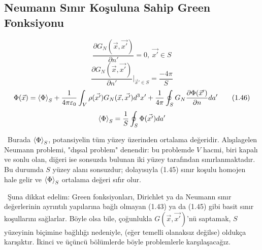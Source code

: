 \subsection{Neumann Sınır Koşuluna Sahip Green Fonksiyonu}
\begin{theorem}
\[ \dfrac{\partial G_{N}(\Vec{x}, \Vec{x'}) }{\partial n'} = 0, \ \Vec{x'} \in S \]
\[  \dfrac{\partial G_{N}(\Vec{x}, \Vec{x'}) }{\partial n'} \Bigg|_{\Vec{x}' \in S}= \dfrac{- 4 \pi}{S} \tag{1.45} \]
\[ \Phi (\Vec{x}) = \left<  \Phi \right>_{S} + \dfrac{1}{4 \pi \varepsilon_{0}} \int_{V} \rho (\Vec{x'}) G_{N} (\Vec{x}, \Vec{x'}) d^{3}x' + \dfrac{1}{4 \pi} \oint_{S} G_{N} \dfrac{\partial \Phi (\Vec{x}')}{\partial n} da' \tag{1.46}  \]
\[  \left<  \Phi \right>_{S} = \dfrac{1}{S} \oint_{S} \Phi (\Vec{x'}) da'\]
\end{theorem}

\dangersign \ Burada $\left<  \Phi \right>_{S}$, potansiyelin tüm yüzey üzerinden ortalama değeridir. Alışılagelen Neumann problemi, "dışsal problem" denendir: bu problemde $V$ hacmi, biri kapalı ve sonlu olan, diğeri ise sonsuzda bulunan iki yüzey tarafından sınırlanmaktadır. Bu durumda $S$ yüzey alanı sonsuzdur; dolayısıyla (1.45) sınır koşulu homojen hale gelir ve $\left<  \Phi \right>_{S}$ ortalama değeri sıfır olur.

\
Şuna dikkat edelim: Green fonksiyonları, Dirichlet ya da Neumann sınır değerlerinin ayrıntılı yapılarına bağlı olmayan (1.43) ya da (1.45) gibi basit sınır koşullarını sağlarlar. Böyle olsa bile, çoğunlukla $G(\Vec{x}, \Vec{x'})$'nü saptamak, $S$ yüzeyinin biçimine bağlılığı nedeniyle, (eğer temelli olanaksız değilse) oldukça karışıktır. İkinci ve üçüncü bölümlerde böyle problemlerle karşılaşacağız.


\newpage 

